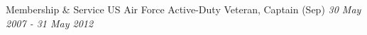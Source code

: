
\begin{rSection}{Membership \& Service}
US Air Force Active-Duty Veteran, Captain (Sep) \hfill {\em 30 May 2007 - 31 May 2012}
\end{rSection}


